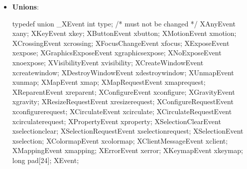 \documentclass{report}
\begin{document}
\begin{itemize}
\begin{itemize}
                \item \textbf{MappingNotify}: Generated when the keyboard, pointer, or modifier mapping changes.
            \end{itemize}
        \item \textbf{Unions}: 
            \begin{cppcode}
                typedef union _XEvent {
                    int type;           /* must not be changed */
                    XAnyEvent xany;
                    XKeyEvent xkey;
                    XButtonEvent xbutton;
                    XMotionEvent xmotion;
                    XCrossingEvent xcrossing;
                    XFocusChangeEvent xfocus;
                    XExposeEvent xexpose;
                    XGraphicsExposeEvent xgraphicsexpose;
                    XNoExposeEvent xnoexpose;
                    XVisibilityEvent xvisibility;
                    XCreateWindowEvent xcreatewindow;
                    XDestroyWindowEvent xdestroywindow;
                    XUnmapEvent xunmap;
                    XMapEvent xmap;
                    XMapRequestEvent xmaprequest;
                    XReparentEvent xreparent;
                    XConfigureEvent xconfigure;
                    XGravityEvent xgravity;
                    XResizeRequestEvent xresizerequest;
                    XConfigureRequestEvent xconfigurerequest;
                    XCirculateEvent xcirculate;
                    XCirculateRequestEvent xcirculaterequest;
                    XPropertyEvent xproperty;
                    XSelectionClearEvent xselectionclear;
                    XSelectionRequestEvent xselectionrequest;
                    XSelectionEvent xselection;
                    XColormapEvent xcolormap;
                    XClientMessageEvent xclient;
                    XMappingEvent xmapping;
                    XErrorEvent xerror;
                    XKeymapEvent xkeymap;
                    long pad[24];
                } XEvent;
            \end{cppcode}


\end{itemize}
\end{document}
